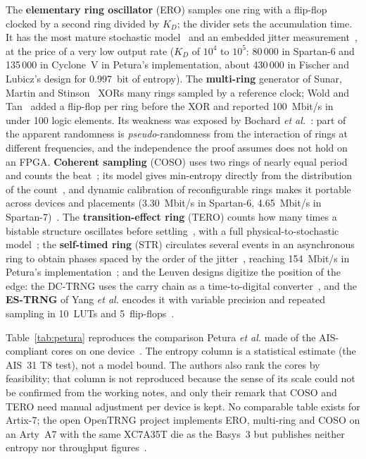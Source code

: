 The \textbf{elementary ring oscillator} (ERO) samples one ring with a
flip-flop clocked by a second ring divided by $K_D$; the divider sets the
accumulation time. It has the most mature stochastic
model~\cite{baudet_2011_security, killmann_2008_design, ma_2014_entropy} and
an embedded jitter measurement~\cite{fischer_2014_embedded}, at the price
of a very low output rate ($K_D$ of $10^4$ to $10^5$: 80\,000 in Spartan-6
and 135\,000 in Cyclone~V in Petura's implementation, about 430\,000 in
Fischer and Lubicz's design for 0.997~bit of entropy). The
\textbf{multi-ring} generator of Sunar, Martin and
Stinson~\cite{sunar_2007_provably} XORs many rings sampled by a reference
clock; Wold and Tan~\cite{wold_2009_analysis} added a flip-flop per ring
before the XOR and reported 100~Mbit/s in under 100 logic elements. Its
weakness was exposed by Bochard \emph{et al.}~\cite{bochard_2010_true}:
part of the apparent randomness is \emph{pseudo}-randomness from the
interaction of rings at different frequencies, and the independence the
proof assumes does not hold on an FPGA. \textbf{Coherent sampling} (COSO)
uses two rings of nearly equal period and counts the beat~\cite{kohlbrenner_2004_embedded,
valtchanov_2009_enhanced}; its model gives min-entropy directly from the
distribution of the count~\cite{peetermans_2021_configurable}, and
dynamic calibration of reconfigurable rings makes it portable across
devices and placements (3.30~Mbit/s in Spartan-6, 4.65~Mbit/s in
Spartan-7)~\cite{peetermans_2019_portable, peetermans_2021_configurable}.
The \textbf{transition-effect ring} (TERO) counts how many times a
bistable structure oscillates before settling~\cite{varchola_2010_new},
with a full physical-to-stochastic model~\cite{bernard_2019_physical};
the \textbf{self-timed ring} (STR) circulates several events in an
asynchronous ring to obtain phases spaced by the order of the
jitter~\cite{cherkaoui_2013_very}, reaching 154~Mbit/s in Petura's
implementation~\cite{petura_2016_survey}; and the Leuven designs digitize
the position of the edge: the DC-TRNG uses the carry chain as a
time-to-digital converter~\cite{rozic_2015_highly}, and the
\textbf{ES-TRNG} of Yang \emph{et al.} encodes it with variable precision
and repeated sampling in 10~LUTs and
5~flip-flops~\cite{yang_2018_estrng}.

Table~\ref{tab:petura} reproduces the comparison Petura \emph{et al.}
made of the AIS-compliant cores on one device~\cite{petura_2016_survey}.
The entropy column is a statistical estimate (the AIS~31 T8 test), not a
model bound. The authors also rank the cores by feasibility; that column
is not reproduced because the sense of its scale could not be confirmed
from the working notes, and only their remark that COSO and TERO need
manual adjustment per device is kept. No comparable table exists for Artix-7; the open OpenTRNG project
implements ERO, multi-ring and COSO on an Arty~A7 with the same XC7A35T
die as the Basys~3 but publishes neither entropy nor throughput
figures~\cite{opentrng_2025_docs}.

